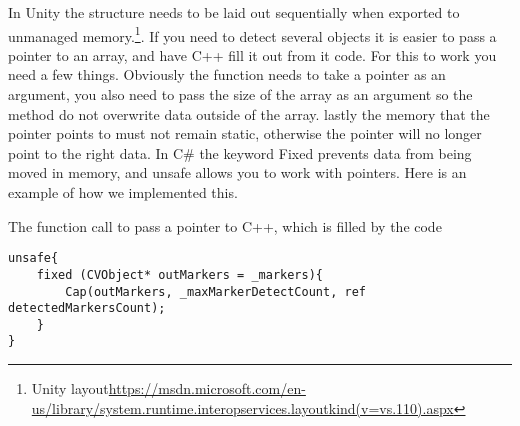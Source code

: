 In Unity the structure needs to be laid out sequentially when exported to unmanaged memory.\footnote{Unity layout\url{https://msdn.microsoft.com/en-us/library/system.runtime.interopservices.layoutkind(v=vs.110).aspx}}. If you need to detect several objects it is easier to pass a pointer to an array, and have C++ fill it out from it code. For this to work you need a few things. Obviously the function needs to take a pointer as an argument, you also need to pass the size of the array as an argument so the method do not overwrite data outside of the array. lastly the memory that the pointer points to must not remain static, otherwise the pointer will no longer point to the right data. In C\# the keyword Fixed prevents data from being moved in memory, and unsafe allows you to work with pointers. Here is an example of how we implemented this.
\begin{listing}[H]
 	\caption{The function call to pass a pointer to C++, which is filled by the code}
 	\label{listing:kernels}
 	\begin{verbatim}
unsafe{
	fixed (CVObject* outMarkers = _markers){
		Cap(outMarkers, _maxMarkerDetectCount, ref detectedMarkersCount);
	}
}
 	\end{verbatim}
\end{listing}